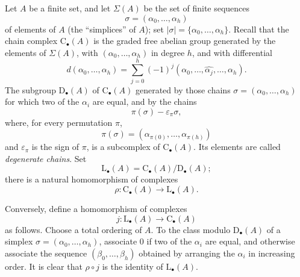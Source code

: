 \begin{env}[11.8.1]
\label{0.11.8.1}
Let $A$ be a finite set, and let $\Sigma(A)$ be the set of finite
sequences
\[
  \sigma=(\alpha_0,\ldots,\alpha_h)
\]
of elements of $A$ (the ``simplices'' of $A$); set
$|\sigma|=\{\alpha_0,\ldots,\alpha_h\}$.
Recall that the chain complex $\mathrm{C}_\bullet(A)$ is the graded free
abelian group generated by the elements of $\Sigma(A)$, with
$(\alpha_0,\ldots,\alpha_h)$ in degree $h$, and with differential
\[
  d(\alpha_0,\ldots,\alpha_h)
  =
  \sum_{j=0}^{h}(-1)^j
  (\alpha_0,\ldots,\widehat{\alpha_j},\ldots,\alpha_h).
\]
The subgroup $\mathrm{D}_\bullet(A)$ of $\mathrm{C}_\bullet(A)$ generated
by those chains $\sigma=(\alpha_0,\ldots,\alpha_h)$ for which two of the
$\alpha_i$ are equal, and by the chains
\[
  \pi(\sigma)-\varepsilon_\pi\sigma,
\]
where, for every permutation $\pi$,
\[
  \pi(\sigma)
  =
  (\alpha_{\pi(0)},\ldots,\alpha_{\pi(h)})
\]
and $\varepsilon_\pi$ is the sign of $\pi$, is a subcomplex of
$\mathrm{C}_\bullet(A)$.
Its elements are called \emph{degenerate chains}.
Set
\[
  \mathrm{L}_\bullet(A)
  =
  \mathrm{C}_\bullet(A)/\mathrm{D}_\bullet(A);
\]
there is a natural homomorphism of complexes
\[
  \rho:\mathrm{C}_\bullet(A)\longrightarrow\mathrm{L}_\bullet(A).
\]

Conversely, define a homomorphism of complexes
\[
  j:\mathrm{L}_\bullet(A)\longrightarrow\mathrm{C}_\bullet(A)
\]
as follows.
Choose a total ordering of $A$.
To the class modulo $\mathrm{D}_\bullet(A)$ of a simplex
$\sigma=(\alpha_0,\ldots,\alpha_h)$, associate $0$ if two of the
$\alpha_i$ are equal, and otherwise associate the sequence
$(\beta_0,\ldots,\beta_h)$ obtained by arranging the $\alpha_i$ in
increasing order.
It is clear that $\rho\circ j$ is the identity of
$\mathrm{L}_\bullet(A)$.
\end{env}

